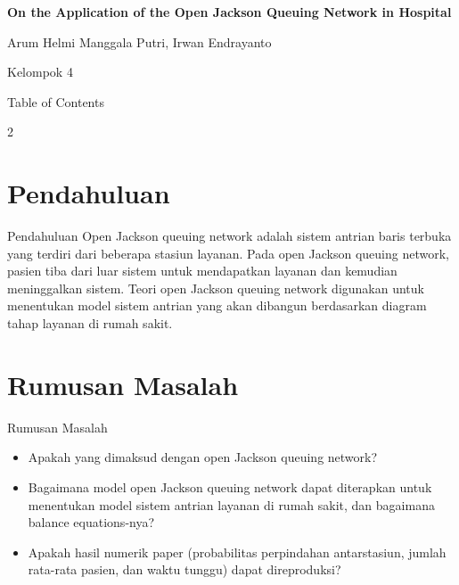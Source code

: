 \documentclass[aspectratio=169]{beamer}
\begin{document}


\begin{frame}
    \begin{center}
    \color{mygreen} \huge \textbf{On the Application of the Open Jackson Queuing Network in Hospital}
    \end{center}
    \begin{center}
        Arum Helmi Manggala Putri, Irwan Endrayanto
    \end{center}
    \begin{center}
        \color{mygreen!90} \large Kelompok 4
    \end{center}
\end{frame}

\begin{frame}{Table of Contents}
	\begin{multicols}{2}
		\tableofcontents
	\end{multicols}
\end{frame}

\section{\color{mygreen}\huge Pendahuluan}
\begin{frame}{Pendahuluan}
Open Jackson queuing network adalah sistem antrian baris terbuka yang terdiri dari beberapa stasiun layanan. Pada open Jackson queuing network, pasien tiba dari luar sistem untuk mendapatkan layanan dan kemudian meninggalkan sistem. Teori open Jackson queuing network digunakan untuk menentukan model sistem antrian yang akan dibangun berdasarkan diagram tahap layanan di rumah sakit.
\end{frame}


\section{\color{mygreen}\huge Rumusan Masalah}
\begin{frame}{Rumusan Masalah}
\begin{itemize}
    \item Apakah yang dimaksud dengan open Jackson queuing network?
    \item Bagaimana model open Jackson queuing network dapat diterapkan untuk menentukan model sistem antrian layanan di rumah sakit, dan bagaimana balance equations-nya?
    \item Apakah hasil numerik paper (probabilitas perpindahan antarstasiun, jumlah rata-rata pasien, dan waktu tunggu) dapat direproduksi?
\end{itemize}
\end{frame}
\end{document}
